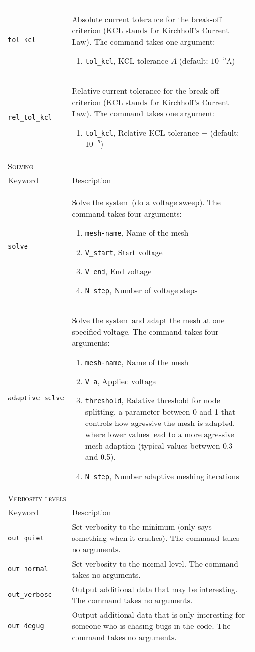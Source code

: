 \documentclass[noshowpacs,preprintnumbers,amsmath,amssymb, letter]{revtex4}
\begin{document}
\begin{longtable}{p{}p{}}
\texttt{tol\_kcl}	&  Absolute current tolerance for the break-off criterion (KCL stands for Kirchhoff's Current Law). The command takes one argument:
\begin{enumerate}
\item \texttt{tol\_kcl}, KCL tolerance $A$ (default: $10^{-5} \text{A}$)
\end{enumerate}\\
\texttt{rel\_tol\_kcl}	&  Relative current tolerance for the break-off criterion (KCL stands for Kirchhoff's Current Law). The command takes one argument:
\begin{enumerate}
\item \texttt{tol\_kcl}, Relative KCL tolerance $-$ (default: $10^{-5}$)
\end{enumerate}\\
\multicolumn{2}{l}{\textsc{Solving}} \\*
\hline
Keyword & Description \\
\texttt{solve}	&  Solve the system (do a voltage sweep). The command takes four arguments:
\begin{enumerate}
\item \texttt{mesh-name}, Name of the mesh
\item \texttt{V\_start}, Start voltage
\item \texttt{V\_end}, End voltage
\item \texttt{N\_step}, Number of voltage steps
\end{enumerate}\\
\texttt{adaptive\_solve}	&  Solve the system and adapt the mesh at one specified voltage. The command takes four arguments:
\begin{enumerate}
\item \texttt{mesh-name}, Name of the mesh
\item \texttt{V\_a}, Applied voltage
\item \texttt{threshold}, Ralative threshold for node splitting, a parameter between 0 and 1 that controls how agressive the mesh is adapted, where lower values lead to a more agressive mesh adaption (typical values betwwen 0.3 and 0.5).
\item \texttt{N\_step}, Number adaptive meshing iterations
\end{enumerate}\\
\multicolumn{2}{l}{\textsc{Verbosity levels}} \\*
\hline
Keyword & Description \\
\texttt{out\_quiet}	&  Set verbosity to the minimum (only says something when it crashes). The command takes no arguments.\\
\texttt{out\_normal}	&  Set verbosity to the normal level. The command takes no arguments.\\
\texttt{out\_verbose}	&  Output additional data that may be interesting. The command takes no arguments.\\
\texttt{out\_degug}	&  Output additional data that is only interesting for someone who is chasing bugs in the code. The command takes no arguments.\\
\hline
\\
\end{longtable}
\end{document}

